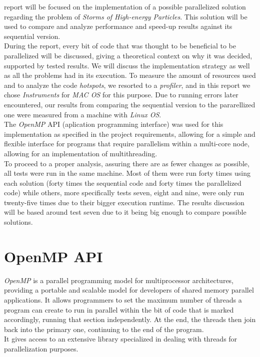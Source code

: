 \documentclass[10pt,journal,compsoc]{IEEEtran}
\begin{document}
 report will be focused on the implementation of a possible parallelized solution regarding the problem of {\itshape Storms of High-energy Particles}. This solution will be used to compare and analyze performance and speed-up results against its sequential version.
\\During the report, every bit of code that was thought to be beneficial to be parallelized will be discussed, giving a theoretical context on why it was decided, supported by tested results. We will discuss the implementation strategy as well as all the problems had in its execution. To measure the amount of resources used and to analyze the code {\itshape hotspots}, we resorted to a {\itshape profiler}, and in this report we chose {\itshape Instruments} for {\itshape MAC OS} for this purpose. Due to running errors later encountered, our results from comparing the sequential version to the pararellized one were measured from a machine with {\itshape Linux OS}.
\\The {\itshape OpenMP} API (aplication programming interface) was used for this implementation as specified in the project requirements, allowing for a simple and flexible interface for programs that require parallelism within a multi-core node, allowing for an implementation of multithreading. 
\\To proceed to a proper analysis, assuring there are as fewer changes as possible, all tests were run in the same machine. Most of them were run forty times using each solution (forty times the sequential code and forty times the parallelized code) while others, more specifically tests seven, eight and nine, were only run twenty-five times due to their bigger execution runtime. The results discussion will be based around test seven due to it being big enough to compare possible solutions. 

\section{OpenMP API}

{\itshape OpenMP} is a parallel programming model for multiprocessor architectures, providing a portable and scalable model for developers of shared memory parallel applications. It allows programmers to set the maximum number of threads a program can create to run in parallel within the bit of code that is marked accordingly, running that section independently.\cite{OpenMP} At the end, the threads then join back into the primary one, continuing to the end of the program.
\\It gives access to an extensive library specialized in dealing with threads for parallelization purposes.
\end{document}
